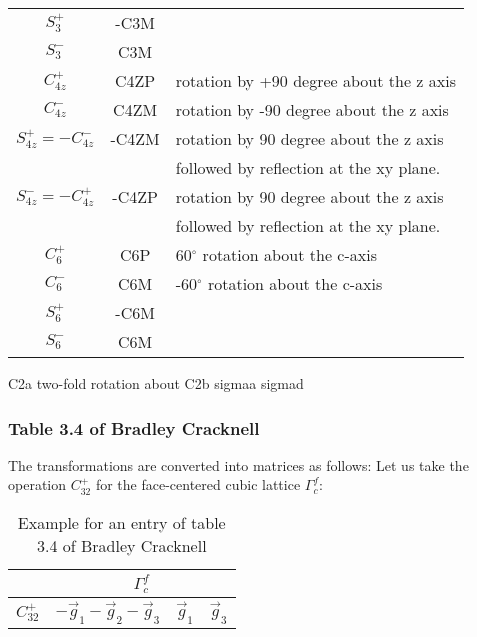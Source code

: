 \documentclass[11pt,a4paper]{report}
\begin{document}
\begin{center}
\begin{tabular}{|c|c|l|}
\hline
$S_{3}^+ $ & -C3M &  \\
$S_{3}^- $ & C3M  &  \\
\hline
$C_{4z}^+$  & C4ZP & rotation by +90 degree about the z axis\\
$C_{4z}^-$  & C4ZM &  rotation by -90 degree about the z axis \\
\hline
$S_{4z}^+=-C_{4z}^-$ &-C4ZM &  rotation by 90 degree about the z axis\\
            & &       followed by reflection at the xy plane.\\
$S_{4z}^-=-C_{4z}^+$ &-C4ZP &  rotation by 90 degree about the z axis\\
            & &       followed by reflection at the xy plane.\\
\hline
$C_{6}^+ $ & C6P & 60$^\circ$ rotation about the c-axis\\
$C_{6}^- $ & C6M & -60$^\circ$ rotation about the c-axis\\
$S_{6}^+ $ & -C6M  &  \\
$S_{6}^- $ &  C6M  &  \\
\hline
\end{tabular}
\end{center}

C2a          two-fold rotation about
C2b
sigmaa
sigmad





\subsubsection{Table 3.4 of Bradley Cracknell}
The transformations are converted into matrices as follows: Let us
take the operation $C^+_{32}$ for the face-centered cubic lattice
$\Gamma^f_c$:
\begin{table}[h!]
\begin{center}
\begin{tabular}{|l|c|c|c|}
\hline
&\multicolumn{3}{|c|}{$\Gamma^f_c$}\\
\hline
$C^+_{32}$ & $-\vec{g}_1-\vec{g}_2-\vec{g}_3$ & $\vec{g}_1$ & $\vec{g}_3$\\
\hline
\end{tabular}
\end{center}
\caption{\label{tab:explanationbradleytable34} Example for an entry of
  table 3.4 of Bradley Cracknell\cite{bradley72_book}}
\end{table}
\end{document}
